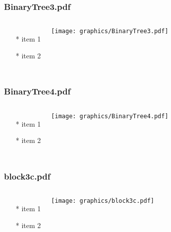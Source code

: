 \documentclass{beamer}
\begin{document}
\begin{frame} \frametitle{BinaryTree3.pdf}
    \begin{columns}[c]
        \begin{itemize}
            \item[*] item 1
            \item[*] item 2
        \end{itemize}
        \begin{minipage}{\linewidth}
            \begin{center}
            \texttt{[image: graphics/BinaryTree3.pdf]}
            \label{gfx:BinaryTree3.pdf}
            \end{center}
        \end{minipage}
    \end{columns}
\end{frame}
\begin{frame} \frametitle{BinaryTree4.pdf}
    \begin{columns}[c]
        \begin{itemize}
            \item[*] item 1
            \item[*] item 2
        \end{itemize}
        \begin{minipage}{\linewidth}
            \begin{center}
            \texttt{[image: graphics/BinaryTree4.pdf]}
            \label{gfx:BinaryTree4.pdf}
            \end{center}
        \end{minipage}
    \end{columns}
\end{frame}
\begin{frame} \frametitle{block3c.pdf}
    \begin{columns}[c]
        \begin{itemize}
            \item[*] item 1
            \item[*] item 2
        \end{itemize}
        \begin{minipage}{\linewidth}
            \begin{center}
            \texttt{[image: graphics/block3c.pdf]}
            \label{gfx:block3c.pdf}
            \end{center}
        \end{minipage}
    \end{columns}
\end{frame}
\end{document}

